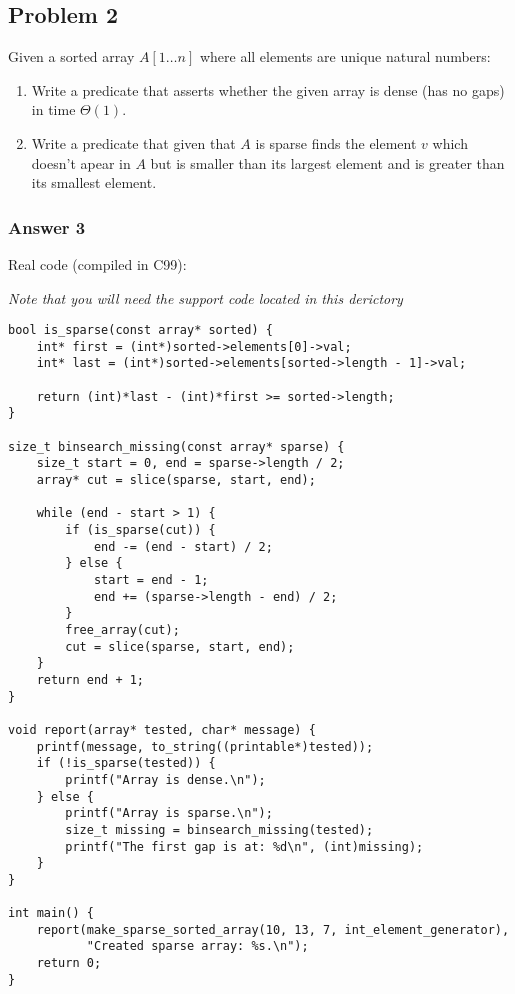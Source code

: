 \documentclass[11pt]{article}
\begin{document}
\subsection{Problem 2}
\label{sec:orgheadline5}
Given a sorted array \(A[1\dots n]\) where all elements are unique natural
numbers:
\begin{enumerate}
\item Write a predicate that asserts whether the given array is dense
(has no gaps) in time \(\Theta(1)\).
\item Write a predicate that given that \(A\) is sparse finds the element \(v\)
which doesn't apear in \(A\) but is smaller than its largest element
and is greater than its smallest element.
\end{enumerate}

\subsubsection{Answer 3}
\label{sec:orgheadline4}
Real code (compiled in C99):

\emph{Note that you will need the support code located in this derictory}

\lstset{language=C,label= ,caption= ,captionpos=b,numbers=none}
\begin{lstlisting}
bool is_sparse(const array* sorted) {
    int* first = (int*)sorted->elements[0]->val;
    int* last = (int*)sorted->elements[sorted->length - 1]->val;

    return (int)*last - (int)*first >= sorted->length;
}

size_t binsearch_missing(const array* sparse) {
    size_t start = 0, end = sparse->length / 2;
    array* cut = slice(sparse, start, end);

    while (end - start > 1) {
        if (is_sparse(cut)) {
            end -= (end - start) / 2;
        } else {
            start = end - 1;
            end += (sparse->length - end) / 2;
        }
        free_array(cut);
        cut = slice(sparse, start, end);
    }
    return end + 1;
}

void report(array* tested, char* message) {
    printf(message, to_string((printable*)tested));
    if (!is_sparse(tested)) {
        printf("Array is dense.\n");
    } else {
        printf("Array is sparse.\n");
        size_t missing = binsearch_missing(tested);
        printf("The first gap is at: %d\n", (int)missing);
    }
}

int main() {
    report(make_sparse_sorted_array(10, 13, 7, int_element_generator),
           "Created sparse array: %s.\n");
    return 0;
}
\end{lstlisting}
\end{document}
